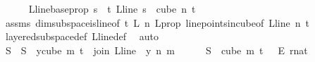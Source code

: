 \begin{isabellebody}
\ \ \ \ \isamarkupfalse%
\ L{\isacharunderscore}{\kern0pt}line{\isacharunderscore}{\kern0pt}base{\isacharunderscore}{\kern0pt}prop{\isacharcolon}{\kern0pt}\ {\isachardoublequoteopen}{\isasymforall}s\ {\isasymin}\ {\isacharbraceleft}{\kern0pt}{\isachardot}{\kern0pt}{\isachardot}{\kern0pt}{\isacharless}{\kern0pt}t{\isacharplus}{\kern0pt}{}{\isacharbraceright}{\kern0pt}{\isachardot}{\kern0pt}\ L{\isacharunderscore}{\kern0pt}line\ s\ {\isasymin}\ cube\ n\ {\isacharparenleft}{\kern0pt}t{\isacharplus}{\kern0pt}{}{\isacharparenright}{\kern0pt}{\isachardoublequoteclose}\ \isamarkupfalse%
\ assms{\isacharparenleft}{\kern0pt}{}{\isacharparenright}{\kern0pt}\ dim{}{\isacharunderscore}{\kern0pt}subspace{\isacharunderscore}{\kern0pt}is{\isacharunderscore}{\kern0pt}line{\isacharbrackleft}{\kern0pt}of\ {\isachardoublequoteopen}t{\isacharplus}{\kern0pt}{}{\isachardoublequoteclose}\ {\isachardoublequoteopen}L{\isachardoublequoteclose}\ {\isachardoublequoteopen}n{\isachardoublequoteclose}{\isacharbrackright}{\kern0pt}\ L{\isacharunderscore}{\kern0pt}prop\ line{\isacharunderscore}{\kern0pt}points{\isacharunderscore}{\kern0pt}in{\isacharunderscore}{\kern0pt}cube{\isacharbrackleft}{\kern0pt}of\ L{\isacharunderscore}{\kern0pt}line\ n\ {\isachardoublequoteopen}t{\isacharplus}{\kern0pt}{}{\isachardoublequoteclose}{\isacharbrackright}{\kern0pt}\ \isamarkupfalse%
\ layered{\isacharunderscore}{\kern0pt}subspace{\isacharunderscore}{\kern0pt}def\ L{\isacharunderscore}{\kern0pt}line{\isacharunderscore}{\kern0pt}def\ \isamarkupfalse%
\ auto\isanewline
\isanewline
\isanewline
\ \ \ \ \isamarkupfalse%
\ {\isasymchi}S\ \ {\isachardoublequoteopen}{\isasymchi}S\ {\isasymequiv}\ {\isacharparenleft}{\kern0pt}{\isasymlambda}y{\isasymin}cube\ m\ {\isacharparenleft}{\kern0pt}t{\isacharplus}{\kern0pt}{}{\isacharparenright}{\kern0pt}{\isachardot}{\kern0pt}\ {\isasymchi}\ {\isacharparenleft}{\kern0pt}join\ {\isacharparenleft}{\kern0pt}L{\isacharunderscore}{\kern0pt}line\ {}{\isacharparenright}{\kern0pt}\ y\ n\ m{\isacharparenright}{\kern0pt}{\isacharparenright}{\kern0pt}{\isachardoublequoteclose}\isanewline
\ \ \ \ \isamarkupfalse%
\ {\isachardoublequoteopen}{\isasymchi}S\ {\isasymin}\ {\isacharparenleft}{\kern0pt}cube\ m\ {\isacharparenleft}{\kern0pt}t\ {\isacharplus}{\kern0pt}\ {}{\isacharparenright}{\kern0pt}{\isacharparenright}{\kern0pt}\ {\isasymrightarrow}\isactrlsub E\ {\isacharbraceleft}{\kern0pt}{\isachardot}{\kern0pt}{\isachardot}{\kern0pt}{\isacharless}{\kern0pt}r{\isacharcolon}{\kern0pt}{\isacharcolon}{\kern0pt}nat{\isacharbraceright}{\kern0pt}{\isachardoublequoteclose}\isanewline

\end{isabellebody}
